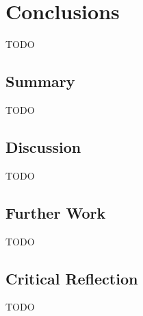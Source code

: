 \chapter{Conclusions}
\label{chap:conc}

TODO

\section{Summary}

TODO

\section{Discussion}

TODO

\section{Further Work}

TODO

\section{Critical Reflection}

TODO